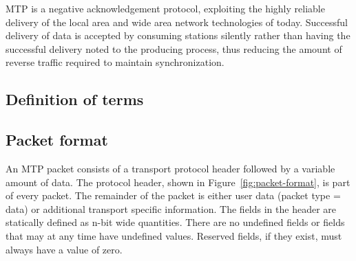 \documentclass[11pt]{article}
\begin{document}
   MTP is a negative acknowledgement protocol, exploiting the highly
   reliable delivery of the local area and wide area network
   technologies of today. Successful delivery of data is accepted by
   consuming stations silently rather than having the successful
   delivery noted to the producing process, thus reducing the amount of
   reverse traffic required to maintain synchronization.

\subsection{Definition of terms}

\begin{center}
\end{center}

\subsection{Packet format}

   An MTP packet consists of a transport protocol header followed by a
   variable amount of data. The protocol header, shown in
   Figure~\ref{fig:packet-format}, is part of every packet. The remainder
   of the packet is either user data (packet type = data) or additional
   transport specific information.  The fields in the header are statically
   defined as n-bit wide quantities. There are no undefined fields or
   fields that may at any time have undefined values.  Reserved fields, if
   they exist, must always have a value of zero.
\end{document}
